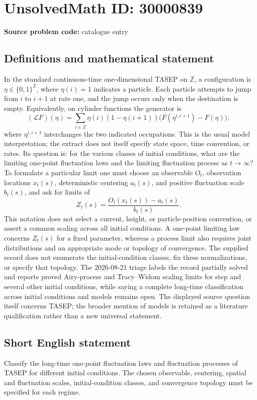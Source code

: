 \documentclass[11pt]{article}
\newcommand{\Z}{\mathbb{Z}}
\begin{document}
\section*{UnsolvedMath ID: 30000839}
\textbf{Source problem code:} catalogue entry
\subsection{Definitions and mathematical statement}
In the standard continuous-time one-dimensional TASEP on $\Z$, a configuration is $\eta\in\{0,1\}^{\Z}$, where $\eta(i)=1$ indicates a particle. Each particle attempts to jump from $i$ to $i+1$ at rate one, and the jump occurs only when the destination is empty. Equivalently, on cylinder functions the generator is \[(\mathcal LF)(\eta)=\sum_{i\in\Z}\eta(i)(1-\eta(i+1))\bigl(F(\eta^{i,i+1})-F(\eta)\bigr),\] where $\eta^{i,i+1}$ interchanges the two indicated occupations. This is the usual model interpretation; the extract does not itself specify state space, time convention, or rates. Its question is: for the various classes of initial conditions, what are the limiting one-point fluctuation laws and the limiting fluctuation process as $t\to\infty$? To formulate a particular limit one must choose an observable $O_t$, observation locations $x_t(s)$, deterministic centering $a_t(s)$, and positive fluctuation scale $b_t(s)$, and ask for limits of \[Z_t(s)=\frac{O_t(x_t(s))-a_t(s)}{b_t(s)}.\] This notation does not select a current, height, or particle-position convention, or assert a common scaling across all initial conditions. A one-point limiting law concerns $Z_t(s)$ for a fixed parameter, whereas a process limit also requires joint distributions and an appropriate mode or topology of convergence. The supplied record does not enumerate the initial-condition classes, fix these normalizations, or specify that topology. The 2026-08-21 triage labels the record partially solved and reports proved Airy-process and Tracy--Widom scaling limits for step and several other initial conditions, while saying a complete long-time classification across initial conditions and models remains open. The displayed source question itself concerns TASEP; the broader mention of models is retained as a literature qualification rather than a new universal statement.
\subsection{Short English statement}
Classify the long-time one-point fluctuation laws and fluctuation processes of TASEP for different initial conditions. The chosen observable, centering, spatial and fluctuation scales, initial-condition classes, and convergence topology must be specified for each regime.
\end{document}
